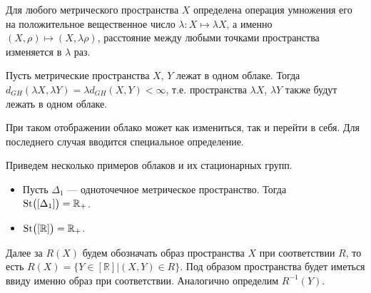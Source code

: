  	 Для любого метрического пространства $X$ определена операция умножения его
на положительное вещественное число $\lambda\colon X\mapsto \lambda X$, а именно
$(X, \rho) \mapsto (X, \lambda \rho)$, расстояние между любыми точками
пространства изменяется в $\lambda$ раз.
 	 \begin{remark} Пусть метрические пространства $X$, $Y$ лежат в одном
облаке. Тогда $d_{GH}(\lambda X, \lambda Y) = \lambda d_{GH}(X,Y) < \infty$,
т.е. пространства $\lambda X$, $\lambda Y$ также будут лежать в одном облаке.
 	 \end{remark}  
При таком отображении облако может как измениться, так и перейти в себя. Для последнего случая вводится специальное определение.

Приведем несколько примеров облаков и их стационарных групп.
 	 
 	 \begin{itemize}
 	 	\item Пусть $\Delta_1$ --- одноточечное метрическое пространство.
Тогда\\ $\operatorname{St}\bigl([\Delta_1]\bigr) = \mathbb{R}_+$.
 	 	\item $\operatorname{St}\bigl([\mathbb{R}]\bigr) = \mathbb{R}_+ $.
 	 \end{itemize}   Далее
за $R(X)$ будем обозначать образ пространства $X$ при
соответствии $R$, то есть
$R(X) = \{Y \in [\mathbb{R}] | (X, Y) \in R\}$. Под образом пространства будет
иметься ввиду именно образ при соответствии.  Аналогично определим $R^{-1}(Y)$.

